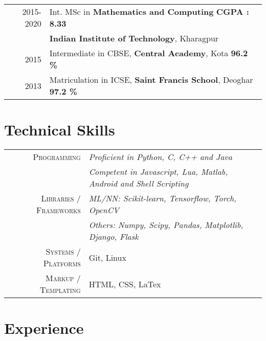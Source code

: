 \documentclass[a4paper,10pt]{extarticle} %
\begin{document}
\begin{tabular}{r|p{18cm}}	
2015-2020 & Int. MSc in \textbf{Mathematics and Computing} \hfill{\textbf{CGPA : 8.33}}\\
&\textbf{Indian Institute of Technology}, Kharagpur\\
2015 & Intermediate in CBSE, \textbf{Central Academy}, Kota  \hfill{\textbf{96.2 \%}}\\
2013 & Matriculation in ICSE, \textbf{Saint Francis School}, Deoghar  \hfill{\textbf{97.2 \%}}
\end{tabular}


\section{Technical Skills}

\begin{tabular}{r|p{18cm}}
\textsc{Programming} & \itshape{Proficient in} Python, C, C++ and Java\\ & \itshape{Competent in} Javascript, Lua, Matlab, Android and Shell Scripting \\
\textsc{Libraries / Frameworks} & \itshape{ML/NN: }Scikit-learn, Tensorflow, Torch, OpenCV\\
& \itshape{Others: }Numpy, Scipy, Pandas, Matplotlib, Django, Flask\\
\textsc{Systems / Platforms} & Git, Linux\\
\textsc{Markup / Templating} & HTML, CSS, LaTex
\end{tabular}






\section{Experience}
\end{document}
